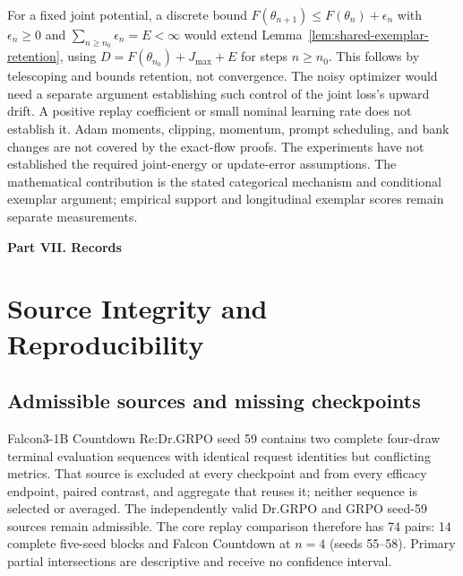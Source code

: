 \documentclass{article}
\newcommand{\1}{\mathbf 1}
\theoremstyle{remark}
\theoremstyle{definition}
\theoremstyle{plain}
\begin{document}
For a fixed joint potential, a discrete bound
$F(\theta_{n+1})\le F(\theta_n)+\epsilon_n$ with
$\epsilon_n\ge0$ and $\sum_{n\ge n_0}\epsilon_n=E<\infty$ would extend
Lemma~\ref{lem:shared-exemplar-retention}, using
$D=F(\theta_{n_0})+J_{\max}+E$ for steps $n\ge n_0$.
This follows by telescoping and bounds retention, not convergence. The noisy
optimizer would need a separate argument establishing such control of the
joint loss's upward drift. A positive replay coefficient or small nominal
learning rate does not establish it. Adam moments, clipping, momentum, prompt
scheduling, and bank changes are not covered by the exact-flow proofs.
The experiments have not established the required joint-energy or
update-error assumptions. The mathematical contribution is the stated
categorical mechanism and conditional exemplar argument; empirical support
and longitudinal exemplar scores remain separate measurements.


\clearpage
{}
\begin{center}\large\textbf{Part VII. Records}\end{center}

\section{Source Integrity and Reproducibility}
\label{app:reproducibility}

\subsection{Admissible sources and missing checkpoints}
\label{app:source-integrity}

Falcon3-1B Countdown Re:Dr.GRPO seed 59 contains two complete four-draw
terminal evaluation sequences with identical request identities but
conflicting metrics. That source is excluded at every
checkpoint and from every efficacy endpoint, paired contrast, and aggregate
that reuses it; neither sequence is selected or averaged. The independently
valid Dr.GRPO and GRPO seed-59 sources remain admissible. The core replay
comparison therefore has 74 pairs: 14 complete five-seed blocks and Falcon
Countdown at $n=4$ (seeds 55--58). Primary partial intersections are
descriptive and receive no confidence interval.
\end{document}
